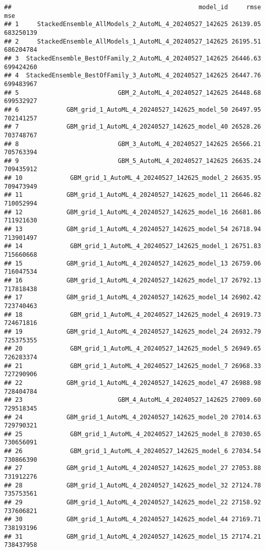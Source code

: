 \documentclass[
]{article}
\begin{document}
\begin{verbatim}
##                                                   model_id     rmse        mse
## 1     StackedEnsemble_AllModels_2_AutoML_4_20240527_142625 26139.05  683250139
## 2     StackedEnsemble_AllModels_1_AutoML_4_20240527_142625 26195.51  686204784
## 3  StackedEnsemble_BestOfFamily_2_AutoML_4_20240527_142625 26446.63  699424260
## 4  StackedEnsemble_BestOfFamily_3_AutoML_4_20240527_142625 26447.76  699483967
## 5                           GBM_2_AutoML_4_20240527_142625 26448.68  699532927
## 6             GBM_grid_1_AutoML_4_20240527_142625_model_50 26497.95  702141257
## 7             GBM_grid_1_AutoML_4_20240527_142625_model_40 26528.26  703748767
## 8                           GBM_3_AutoML_4_20240527_142625 26566.21  705763394
## 9                           GBM_5_AutoML_4_20240527_142625 26635.24  709435912
## 10             GBM_grid_1_AutoML_4_20240527_142625_model_2 26635.95  709473949
## 11            GBM_grid_1_AutoML_4_20240527_142625_model_11 26646.82  710052994
## 12            GBM_grid_1_AutoML_4_20240527_142625_model_16 26681.86  711921630
## 13            GBM_grid_1_AutoML_4_20240527_142625_model_54 26718.94  713901497
## 14             GBM_grid_1_AutoML_4_20240527_142625_model_1 26751.83  715660668
## 15            GBM_grid_1_AutoML_4_20240527_142625_model_13 26759.06  716047534
## 16            GBM_grid_1_AutoML_4_20240527_142625_model_17 26792.13  717818438
## 17            GBM_grid_1_AutoML_4_20240527_142625_model_14 26902.42  723740463
## 18             GBM_grid_1_AutoML_4_20240527_142625_model_4 26919.73  724671816
## 19            GBM_grid_1_AutoML_4_20240527_142625_model_24 26932.79  725375355
## 20             GBM_grid_1_AutoML_4_20240527_142625_model_5 26949.65  726283374
## 21             GBM_grid_1_AutoML_4_20240527_142625_model_7 26968.33  727290906
## 22            GBM_grid_1_AutoML_4_20240527_142625_model_47 26988.98  728404784
## 23                          GBM_4_AutoML_4_20240527_142625 27009.60  729518345
## 24            GBM_grid_1_AutoML_4_20240527_142625_model_20 27014.63  729790321
## 25             GBM_grid_1_AutoML_4_20240527_142625_model_8 27030.65  730656091
## 26             GBM_grid_1_AutoML_4_20240527_142625_model_6 27034.54  730866390
## 27            GBM_grid_1_AutoML_4_20240527_142625_model_27 27053.88  731912276
## 28            GBM_grid_1_AutoML_4_20240527_142625_model_32 27124.78  735753561
## 29            GBM_grid_1_AutoML_4_20240527_142625_model_22 27158.92  737606821
## 30            GBM_grid_1_AutoML_4_20240527_142625_model_44 27169.71  738193196
## 31            GBM_grid_1_AutoML_4_20240527_142625_model_15 27174.21  738437958

\end{verbatim}
\end{document}
